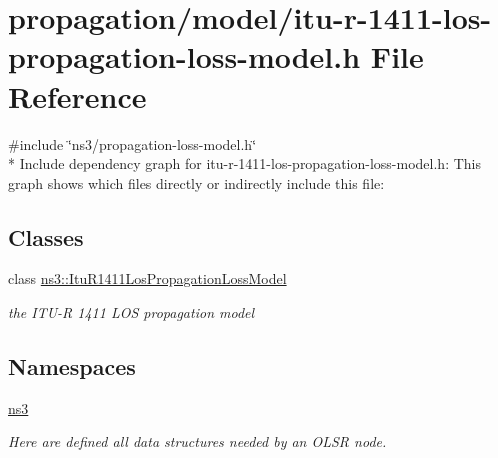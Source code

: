 \hypertarget{itu-r-1411-los-propagation-loss-model_8h}{}\section{propagation/model/itu-\/r-\/1411-\/los-\/propagation-\/loss-\/model.h File Reference}
\label{itu-r-1411-los-propagation-loss-model_8h}
{\ttfamily \#include \char`\"{}ns3/propagation-\/loss-\/model.\+h\char`\"{}}\\*
Include dependency graph for itu-\/r-\/1411-\/los-\/propagation-\/loss-\/model.h\+:
This graph shows which files directly or indirectly include this file\+:
\subsection*{Classes}
\begin{DoxyCompactItemize}
\item 
class \hyperlink{classns3_1_1ItuR1411LosPropagationLossModel}{ns3\+::\+Itu\+R1411\+Los\+Propagation\+Loss\+Model}
\begin{DoxyCompactList}\small\item\em the I\+T\+U-\/R 1411 L\+OS propagation model \end{DoxyCompactList}\end{DoxyCompactItemize}
\subsection*{Namespaces}
\begin{DoxyCompactItemize}
\item 
 \hyperlink{namespacens3}{ns3}
\begin{DoxyCompactList}\small\item\em Here are defined all data structures needed by an O\+L\+SR node. \end{DoxyCompactList}\end{DoxyCompactItemize}
